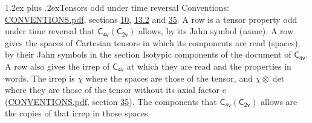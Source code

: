 \documentclass[10pt,a4paper]{article}
\makeatletter
\renewcommand\section{\@startsection{section}{1}{\z@}{-3ex plus -1ex minus -.2ex}%
  {1.2ex plus .2ex}{\normalfont\large\sffamily\bfseries\color{parttitle}}}
\numberwithin{equation}{section}
\newcommand{\grp}[1]{\mathsf{#1}}
\newcommand{\irrprod}{\otimes}
\makeatother
\begin{document}
\section{Tensors odd under time reversal}\label{s:time_odd}
Conventions: \href{../../CONVENTIONS.pdf}{CONVENTIONS.pdf}, sections \href{../../../rotation/CONVENTIONS.pdf\#conv.10}{10}, \href{../../../rotation/CONVENTIONS.pdf\#conv.13.2}{13.2} and \href{../../CONVENTIONS.pdf\#conv.35}{35}.
\leavevmode\label{n:head.name.property}A row is a tensor property odd under time reversal that $\grp{C_{4v}}(\grp{C_{2v}})$ allows, by its Jahn symbol (name). \label{n:head.spaces}A row gives the spaces of Cartesian tensors in which its components are read (spaces), by their Jahn symbols in the section Isotypic components of the document of \href{../../../rotation/data/pdf/C4v.pdf}{$\grp{C_{4v}}$}. \label{n:head.properties}A row also gives the irrep of $\grp{C_{4v}}$ at which they are read and the properties in words. The irrep is $\chi$ where the spaces are those of the tensor, and $\chi \irrprod \det$ where they are those of the tensor without its axial factor e (\href{../../CONVENTIONS.pdf}{CONVENTIONS.pdf}, section \href{../../CONVENTIONS.pdf\#conv.35}{35}). The components that $\grp{C_{4v}}(\grp{C_{2v}})$ allows are the copies of that irrep in those spaces.
\end{document}
